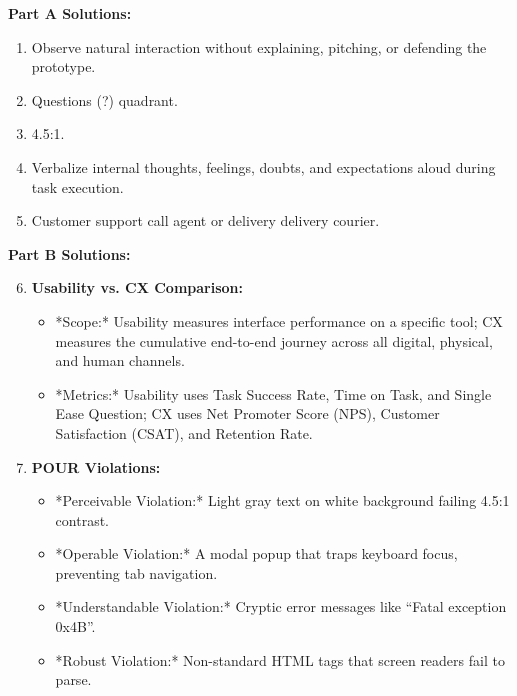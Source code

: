 \begin{solutionbox}
\textbf{Part A Solutions:}
\begin{enumerate}[leftmargin=1.2em, itemsep=2pt]
    \item Observe natural interaction without explaining, pitching, or defending the prototype.
    \item Questions (?) quadrant.
    \item 4.5:1.
    \item Verbalize internal thoughts, feelings, doubts, and expectations aloud during task execution.
    \item Customer support call agent or delivery delivery courier.
\end{enumerate}

\textbf{Part B Solutions:}
\begin{enumerate}[leftmargin=1.2em, itemsep=3pt]
    \setcounter{enumi}{5}
    \item \textbf{Usability vs. CX Comparison:}
    \begin{itemize}
        \item *Scope:* Usability measures interface performance on a specific tool; CX measures the cumulative end-to-end journey across all digital, physical, and human channels.
        \item *Metrics:* Usability uses Task Success Rate, Time on Task, and Single Ease Question; CX uses Net Promoter Score (NPS), Customer Satisfaction (CSAT), and Retention Rate.
    \end{itemize}
    \item \textbf{POUR Violations:}
    \begin{itemize}
        \item *Perceivable Violation:* Light gray text on white background failing 4.5:1 contrast.
        \item *Operable Violation:* A modal popup that traps keyboard focus, preventing tab navigation.
        \item *Understandable Violation:* Cryptic error messages like ``Fatal exception 0x4B''.
        \item *Robust Violation:* Non-standard HTML tags that screen readers fail to parse.
    \end{itemize}
\end{enumerate}


\end{solutionbox}
